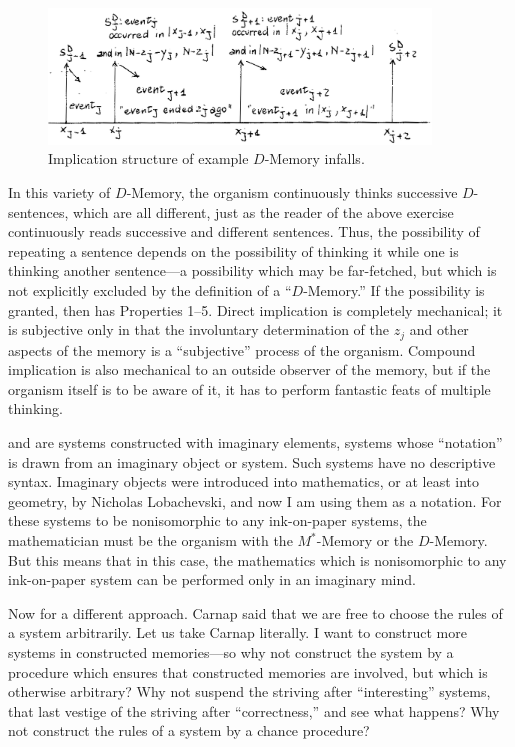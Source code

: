 \begin{figure}
	\centering
	\includegraphics[width=4in]{img/infallsdiag}
	\caption{Implication structure of example $D$-Memory infalls.}
	\label{infallsdiag}
\end{figure}

In this variety of $D$-Memory, the organism continuously thinks successive 
$D$-sentences, which are all different, just as the reader of the above exercise 
continuously reads successive and different sentences. Thus, the possibility 
of repeating a sentence depends on the possibility of thinking it while one is 
thinking another sentence---a possibility which may be far-fetched, but which 
is not explicitly excluded by the definition of a \enquote{$D$-Memory.} If the 
possibility is granted, then  has Properties 1--5. Direct implication is 
completely mechanical; it is subjective only in that the involuntary 
determination of the $z_j$ and other aspects of the memory is a \enquote{subjective}
process of the organism. Compound implication is also mechanical to an 
outside observer of the memory, but if the organism itself is to be aware of 
it, it has to perform fantastic feats of multiple thinking. 

 and  are systems constructed with 
imaginary elements, systems whose \enquote{notation} is drawn from an imaginary 
object or system. Such systems have no descriptive syntax. Imaginary objects 
were introduced into mathematics, or at least into geometry, by Nicholas 
Lobachevski, and now I am using them as a notation. For these systems to 
be nonisomorphic to any ink-on-paper systems, the mathematician must be 
the organism with the $M^*$-Memory or the $D$-Memory. But this means that 
in this case, the mathematics which is nonisomorphic to any ink-on-paper 
system can be performed only in an imaginary mind. 

Now for a different approach. Carnap said that we are free to choose 
the rules of a system arbitrarily. Let us take Carnap literally. I want to 
construct more systems in constructed memories---so why not construct the 
system by a procedure which ensures that constructed memories are 
involved, but which is otherwise arbitrary? Why not suspend the striving 
after \enquote{interesting} systems, that last vestige of the striving after 
\enquote{correctness,} and see what happens? Why not construct the rules of a 
system by a chance procedure? 

